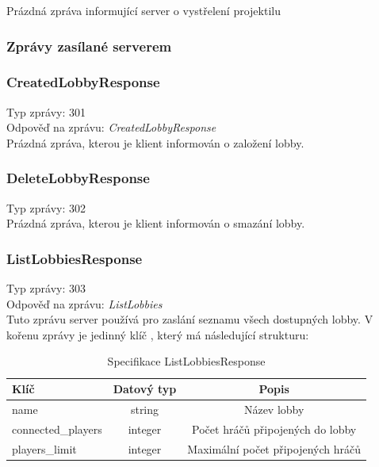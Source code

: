 \documentclass[12pt, a4paper]{article}
\begin{document}
    Prázdná zpráva informující server o vystřelení projektilu

    \subsubsection{Zprávy zasílané serverem}
    \subsubsection*{CreatedLobbyResponse}
    Typ zprávy: 301\\
    Odpověď na zprávu: \textit{CreatedLobbyResponse}\\

    Prázdná zpráva, kterou je klient informován o založení lobby.

    \subsubsection*{DeleteLobbyResponse}
    Typ zprávy: 302\\

    Prázdná zpráva, kterou je klient informován o smazání lobby.

    \subsubsection*{ListLobbiesResponse}
    Typ zprávy: 303\\
    Odpověď na zprávu: \textit{ListLobbies}\\

    Tuto zprávu server používá pro zaslání seznamu všech dostupných lobby.
    V kořenu zprávy je jedinný klíč , který má následující strukturu:

    \begin{table}[H]
        \centering
        \begin{tabular}{|l|c|c|}
            \hline
            Klíč & Datový typ & Popis\\
            \hline
            \hline
            name & string & Název lobby\\
            \hline
            connected\_players & integer & Počet hráčů připojených do lobby\\
            \hline
            players\_limit & integer & Maximální počet připojených hráčů\\
            \hline
        \end{tabular}
        \caption{Specifikace ListLobbiesResponse}
    \end{table}
\end{document}
